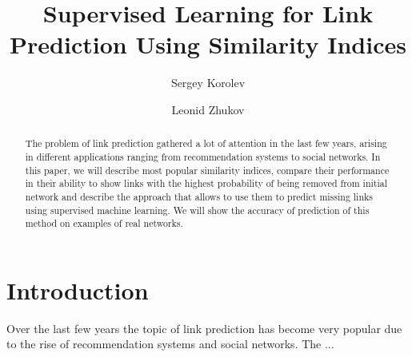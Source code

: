 \documentclass{llncs}
\begin{document}
%
\title{Supervised Learning for Link Prediction Using Similarity Indices}
%
%
\author{Sergey Korolev \and Leonid Zhukov}
%
%
%

\maketitle              %

\begin{abstract}
The problem of link prediction gathered a lot of attention in the last few years,
arising in different applications ranging from recommendation systems to social networks.
In this paper, we will describe most popular similarity indices, compare their
performance in their ability to show links with the highest probability
of being removed from initial network and describe the approach
that allows to use them to predict missing links using supervised machine learning. 
We will show the accuracy of prediction of this method on examples of real networks.
\end{abstract}
%
\section{Introduction}
%
Over the last few years the topic of link prediction has become very popular due to the rise of recommendation systems and social networks. The ...
\end{document}

